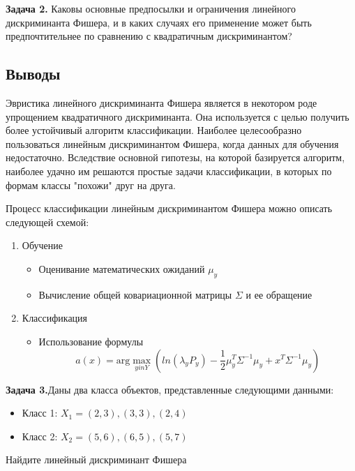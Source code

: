 \textbf{Задача 2.} Каковы основные предпосылки и ограничения линейного дискриминанта Фишера, и в каких случаях его применение может быть предпочтительнее по сравнению с квадратичным дискриминантом?

\subsection*{Выводы}

Эвристика линейного дискриминанта Фишера является в некотором роде упрощением квадратичного дискриминанта. Она используется с целью получить более устойчивый алгоритм классификации. Наиболее целесообразно пользоваться линейным дискриминантом Фишера, когда данных для обучения недостаточно. Вследствие основной гипотезы, на которой базируется алгоритм, наиболее удачно им решаются простые задачи классификации, в которых по формам классы "похожи" друг на друга.

Процесс классификации линейным дискриминантом Фишера можно описать следующей схемой:
\begin{enumerate}
    \item Обучение
          \begin{itemize}
              \item Оценивание математических ожиданий $\mu_y$
              \item Вычисление общей ковариационной матрицы $\Sigma$ и ее обращение
          \end{itemize}

    \item Классификация
          \begin{itemize}
              \item Использование формулы
                    \[
                        a(x) = \mathrm{arg}\max_{yin Y} \left( ln(\lambda_{y} P_y) - \frac{1}{2}\mu_{y}^{T} \Sigma^{-1} \mu_y + x^T \Sigma^{-1} \mu_y \right)
                    \]
          \end{itemize}
\end{enumerate}

\textbf{Задача 3.}Даны два класса объектов, представленные следующими данными:

\begin{itemize}
    \item Класс 1: $X_1 = {(2, 3), (3, 3), (2, 4)}$
    \item Класс 2: $X_2 = {(5, 6), (6, 5), (5, 7)}$
\end{itemize}

Найдите линейный дискриминант Фишера
\newline

